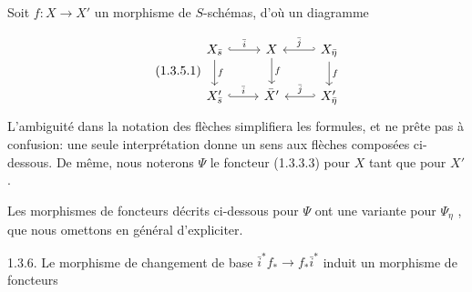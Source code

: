 Soit $f : X \longrightarrow X'$ un morphisme de $S$-schémas, d'où un diagramme

\begin{equation}\tag{1.3.5.1}
\begin{tikzcd}
X_{\bar s} \arrow[r, hook, "\bar i"] \arrow[d, "f"] & X \arrow[d, "f"] & X_{\bar \eta} \arrow[l, hook', "\bar j"'] \arrow[d, "f"] \\
X'_{\bar s} \arrow[r, hook, "\bar i"] & \bar X' & X'_{\bar \eta} \arrow[l, hook', "\bar j"']
\end{tikzcd}
\end{equation}
L'ambiguité dans la notation des flèches simplifiera les formules, et ne prête pas à confusion: une seule interprétation donne un sens aux flèches composées ci-dessous. De même, nous noterons $\Psi$ le foncteur (1.3.3.3) pour $X$ tant que pour $X'$ .

Les morphismes de foncteurs décrits ci-dessous pour $\Psi$ ont une variante pour $\Psi_\eta$ , que nous omettons en général d'expliciter.



1.3.6. Le morphisme de changement de base $\bar{i}^* f_* \longrightarrow f_* \bar{i}^*$ induit un morphisme de foncteurs

